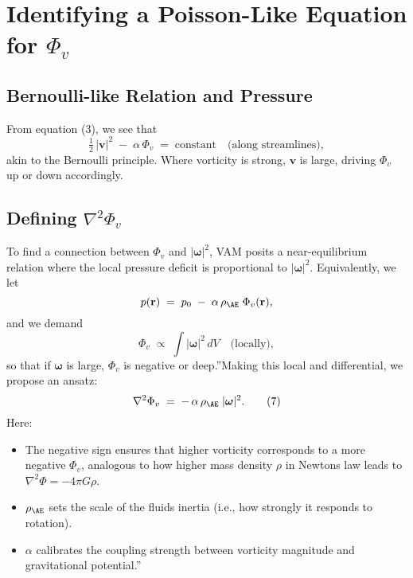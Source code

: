 \section{Identifying a Poisson-Like Equation for \(\Phi_v\)}

\subsection{Bernoulli-like Relation and Pressure}
From equation (3), we see that
\[
    \tfrac12\,|\mathbf{v}|^2
    \;-\;
    \alpha\,\Phi_v
    \;=\;
    \mathrm{constant}
    \quad
    \text{(along streamlines)},
\]
akin to the Bernoulli principle. Where vorticity is strong, \(\mathbf{v}\) is large, driving \(\Phi_v\) up or down accordingly.

\subsection{Defining \(\nabla^2 \Phi_v\)}
To find a connection between \(\Phi_v\) and \(|\boldsymbol{\omega}|^2\), VAM posits a near-equilibrium relation where the local pressure deficit is proportional to \(|\boldsymbol{\omega}|^2\). Equivalently, we let
\[
    p(\mathbf{r})
    \;=\;
    p_0
    \;-\;
    \alpha\,\rho_{\mathrm{\AE}}
    \;\Phi_v(\mathbf{r}),
\]
and we demand
\[
    \Phi_v
    \;\propto\;
    \int |\boldsymbol{\omega}|^2 \,dV
    \quad
    \text{(locally)},
\]
so that if \(\boldsymbol{\omega}\) is large, \(\Phi_v\) is negative or \grqq deep.\textquotedblright  Making this local and differential, we propose an ansatz:
\[
    \nabla^2 \Phi_v
    \;=\;
    -\,\alpha\,\rho_{\mathrm{\AE}}\;\lvert \boldsymbol{\omega}\rvert^2.
    \tag{7}
\]
Here:
\begin{itemize}
    \item The negative sign ensures that higher vorticity corresponds to a more negative \(\Phi_v\), analogous to how higher mass density \(\rho\) in Newton\rqs s law leads to \(\nabla^2 \Phi = -4\pi G\rho\).
    \item \(\rho_{\mathrm{\AE}}\) sets the scale of the fluid\rqs s inertia (i.e., how strongly it responds to rotation).
    \item \(\alpha\) calibrates the coupling strength between vorticity magnitude and \grqq gravitational potential.\textquotedblright
\end{itemize}

